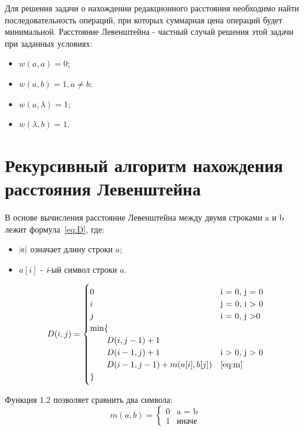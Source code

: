 \documentclass[12pt]{report}
\begin{document}
    Для решения задачи о нахождении редакционного расстояния необходимо найти последовательность операций, при которых
    суммарная цена операций будет минимальной. Расстояние Левенштейна - частный случай решения этой задачи
    при заданных условиях:
    \begin{itemize}
        \item $w(a, a) = 0$;
        \item $w(a, b) = 1, a \neq b$;
        \item $w(a, \lambda) = 1$;
        \item $w(\lambda, b) = 1$.
    \end{itemize}


    \section{Рекурсивный алгоритм нахождения расстояния Левенштейна}\label{sec:ReccursiveLev}
    В основе вычисления расстояние Левенштейна между двумя строками a и b лежит формула~\ref{eq:D},
    где:
    \begin{itemize}
        \item $\abs{a}$ означает длину строки $a$;
        \item $a[i]$ - \emph{i}-ый символ строки $a$.
    \end{itemize}

    \begin{equation}
        \label{eq:D}
        D(i, j) = \begin{cases}
                      0 &\text{i = 0, j = 0} \\
                      i &\text{j = 0, i > 0} \\
                      j &\text{i = 0, j >0} \\
                      \min \lbrace \\
                      \qquad D(i, j - 1) + 1 \\
                      \qquad D(i - 1, j) + 1 &\text{i > 0, j > 0} \\
                      \qquad D(i - 1, j - 1) + m(a[i], b[j]) &\text{\ref{eq:m}} \\
                      \rbrace
        \end{cases}
    \end{equation}

    Функция 1.2 позволяет сравнить два символа:
    \begin{equation}
        \label{eq:m}
        m(a, b) = \begin{cases}
                      0 &\text{a = b} \\
                      1 &\text{иначе}
        \end{cases}
    \end{equation}
\end{document}
